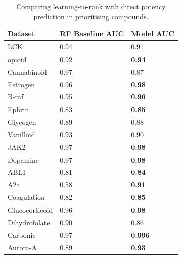     
\begin{table}[]
\centering
\begin{tabular}{|l|l|l|}
\hline
\textbf{Dataset} & \textbf{RF Baseline AUC} & \textbf{Model AUC}  \\ \hline
LCK              & 0.94              & 0.91          \\ \hline
opioid           & 0.92                & \textbf{0.94} \\ \hline
Cannabinoid      & 0.97               & 0.87          \\ \hline
Estrogen         & 0.96               & \textbf{0.98} \\ \hline
B-raf            & 0.95              & \textbf{0.96} \\ \hline
Ephrin           & 0.83               & \textbf{0.85} \\ \hline
Glycogen         & 0.89             & 0.88         \\ \hline
Vanilloid        & 0.93              & 0.90          \\ \hline
JAK2             & 0.97              & \textbf{0.98} \\ \hline
Dopamine         & 0.97               & \textbf{0.98} \\ \hline
ABL1             & 0.81               & \textbf{0.84} \\ \hline
A2a              & 0.58              & \textbf{0.91} \\ \hline
Coagulation      & 0.82                & \textbf{0.85}  \\ \hline
Glucocorticoid   & 0.96             & \textbf{0.98} \\ \hline
Dihydrofolate    & 0.90               & 0.86          \\ \hline
Carbonic         & 0.97              & \textbf{0.996} \\ \hline
Aurora-A         & 0.89               & \textbf{0.93} \\ \hline
\end{tabular}
\caption{Comparing learning-to-rank with direct potency prediction in prioritising compounds.}
\label{table1}
\end{table}
